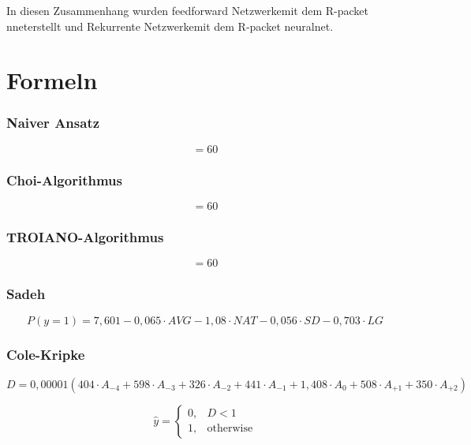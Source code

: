 In diesen Zusammenhang wurden \glqq feedforward Netzwerke\grqq mit dem R-packet \glqq nnet\grqq erstellt und \glqq Rekurrente Netzwerke\grqq mit dem R-packet  \glqq neuralnet\grqq.






\section{Formeln}

\subsubsection{Naiver Ansatz}
$$ = 60$$

\subsubsection{Choi-Algorithmus}
$$ = 60$$

\subsubsection{TROIANO-Algorithmus}
$$ = 60$$

\subsubsection{Sadeh}
$$ P(y=1) = 7,601 -  0,065 \cdot AVG - 1,08 \cdot NAT - 0,056 \cdot SD - 0,703 \cdot LG$$

\subsubsection{Cole-Kripke}
\begin{equation} D = 0,00001 (404 \cdot A_{-4} + 598 \cdot A_{-3} + 326 \cdot A_{-2} + 441 \cdot A_{-1} + 1,408 \cdot A_{0} + 508 \cdot A_{+1} + 350 \cdot A_{+2}) \end{equation}

\begin{equation}
    \hat{y} = 
 \begin{cases} 
      0, & D < 1 \\
      1, & \text{otherwise}
 \end{cases}
\end{equation}


